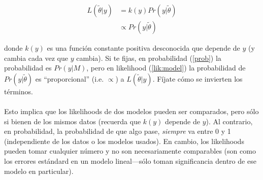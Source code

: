 \documentclass[10pt]{article}
\begin{document}
\begin{equation} \label{lik:model}
\begin{split}
L(\tilde{\theta}|y) & =  k(y)Pr(y|\tilde{\theta})\\
& \propto Pr(y|\tilde{\theta})
\end{split}
\end{equation}

donde $k(y)$ es una funci\'on constante positiva desconocida que depende de $y$ (y cambia cada vez que $y$ cambia). Si te fijas, en probabilidad (\autoref{prob}) la probabilidad es $Pr(y|M)$, pero en likelihood (\autoref{lik:model}) la probabilidad de $Pr(y|\tilde{\theta})$ es ``proporcional'' (i.e. $\propto$) a $L(\tilde{\theta}|y)$. F\'ijate c\'omo se invierten los t\'erminos.

\paragraph{} Esto implica que los likelihoods de dos modelos pueden ser comparados, pero s\'olo si bienen de los mismos datos (recuerda que $k(y)$ depende de $y$). Al contrario, en probabilidad, la probabilidad de que algo pase, \emph{siempre} va entre 0 y 1 (independiente de los datos o los modelos usados). En cambio, los likelihoods pueden tomar cualquier n\'umero y no son necesariamente comparables (son como los errores est\'andard en un modelo lineal---s\'olo toman significancia dentro de ese modelo en particular).


\paragraph{}
\paragraph{}
\setcounter{page}{1}
\printbibliography
\end{document}
